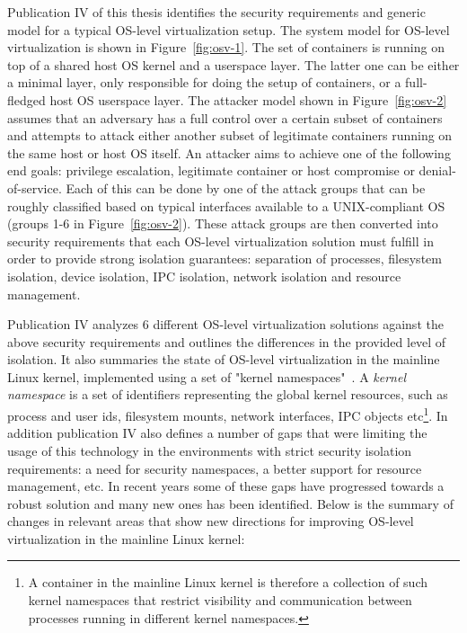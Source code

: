 Publication IV of this thesis identifies the security requirements and generic model for a typical OS-level virtualization setup.
The system model for OS-level virtualization is shown in Figure~\ref{fig:osv-1}. The set of containers  is running on top of a shared host OS kernel and a userspace layer. The latter one can be either a minimal layer, only responsible for doing the setup of containers, or a full-fledged host OS userspace layer. The attacker model shown in Figure~\ref{fig:osv-2} assumes that an adversary has a full control over a certain subset of containers and attempts to attack either another subset of legitimate containers running on the same host or host OS itself. An attacker aims to achieve one of the following end goals: privilege escalation, legitimate container or host compromise or denial-of-service. Each of this can be done by one of the attack groups that can be roughly classified based on typical interfaces available to a UNIX-compliant OS (groups 1-6 in Figure~\ref{fig:osv-2}). These attack groups are then converted into security requirements that each OS-level virtualization solution must fulfill in order to provide strong isolation guarantees: separation of processes, filesystem isolation, device isolation, IPC isolation, network isolation and resource management.   

Publication IV analyzes 6 different OS-level virtualization solutions against the above security requirements and outlines the differences in the provided level of isolation. It also summaries the state of OS-level virtualization in the mainline Linux kernel, implemented using a set of "kernel namespaces"~\cite{biederman2006}. A \textit{kernel namespace} is a set of identifiers representing the global kernel resources, such as process and user ids, filesystem mounts, network interfaces, IPC objects etc\footnote{A container in the mainline Linux kernel is therefore a collection of such kernel namespaces that restrict visibility and communication between processes running in different kernel namespaces.}. In addition publication IV also defines a number of gaps that were limiting the usage of this technology in the environments with strict security isolation requirements: a need for security namespaces, a better support for resource management, etc. In recent years some of these gaps have progressed towards a robust solution and many new ones has been identified. Below is the summary of changes in relevant areas that show new directions for improving OS-level virtualization in the mainline Linux kernel:  

